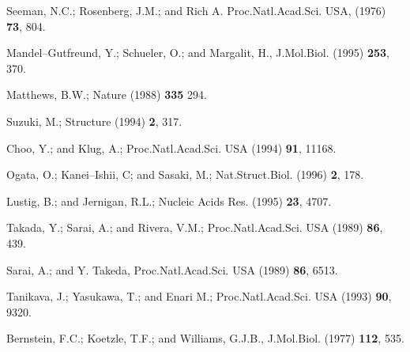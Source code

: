 \begin{thebibliography}{999}     



Seeman, N.C.; Rosenberg, J.M.; and Rich A.
Proc.Natl.Acad.Sci. USA, (1976) {\bf 73}, 804.

Mandel--Gutfreund, Y.; Schueler, O.; and Margalit, H.,
J.Mol.Biol. (1995) {\bf 253}, 370.

Matthews, B.W.; 
Nature (1988) {\bf 335} 294.

Suzuki, M.;
Structure (1994) {\bf 2}, 317.

Choo, Y.; and Klug, A.;
Proc.Natl.Acad.Sci. USA (1994) {\bf 91}, 11168.

Ogata, O.; Kanei--Ishii, C; and Sasaki, M.;
Nat.Struct.Biol. (1996) {\bf 2}, 178.

Lustig, B.; and Jernigan, R.L.;
Nucleic Acids Res. (1995) {\bf 23}, 4707.

Takada, Y.; Sarai, A.; and Rivera, V.M.;
Proc.Natl.Acad.Sci. USA (1989) {\bf 86}, 439.

Sarai, A.; and Y. Takeda,
Proc.Natl.Acad.Sci. USA (1989) {\bf 86}, 6513.

Tanikava, J.; Yasukawa, T.; and Enari M.;
Proc.Natl.Acad.Sci. USA (1993) {\bf 90}, 9320.

Bernstein, F.C.; Koetzle, T.F.; and Williams, G.J.B.,
J.Mol.Biol. (1977) {\bf 112}, 535.


\end{thebibliography}
